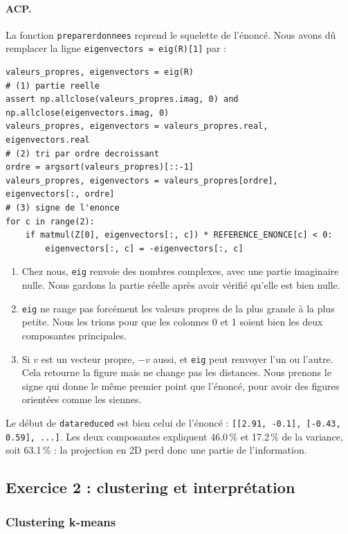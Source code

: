 \documentclass[11pt,a4paper]{article}
\renewcommand{\_}{\underscoreorig\allowbreak}
\begin{document}
\paragraph{ACP.} La fonction \texttt{preparer\_donnees} reprend le squelette de l'énoncé. Nous avons dû remplacer la ligne \texttt{eigenvectors = eig(R)[1]} par :
\begin{lstlisting}
valeurs_propres, eigenvectors = eig(R)
# (1) partie reelle
assert np.allclose(valeurs_propres.imag, 0) and np.allclose(eigenvectors.imag, 0)
valeurs_propres, eigenvectors = valeurs_propres.real, eigenvectors.real
# (2) tri par ordre decroissant
ordre = argsort(valeurs_propres)[::-1]
valeurs_propres, eigenvectors = valeurs_propres[ordre], eigenvectors[:, ordre]
# (3) signe de l'enonce
for c in range(2):
    if matmul(Z[0], eigenvectors[:, c]) * REFERENCE_ENONCE[c] < 0:
        eigenvectors[:, c] = -eigenvectors[:, c]
\end{lstlisting}
\begin{enumerate}
  \item Chez nous, \texttt{eig} renvoie des nombres complexes, avec une partie imaginaire nulle. Nous gardons la partie réelle après avoir vérifié qu'elle est bien nulle.
  \item \texttt{eig} ne range pas forcément les valeurs propres de la plus grande à la plus petite. Nous les trions pour que les colonnes 0 et 1 soient bien les deux composantes principales.
  \item Si $v$ est un vecteur propre, $-v$ aussi, et \texttt{eig} peut renvoyer l'un ou l'autre. Cela retourne la figure mais ne change pas les distances. Nous prenons le signe qui donne le même premier point que l'énoncé, pour avoir des figures orientées comme les siennes.
\end{enumerate}
Le début de \texttt{data\_reduced} est bien celui de l'énoncé : \texttt{[[2.91, -0.1], [-0.43, 0.59], ...]}. Les deux composantes expliquent 46.0\,\% et 17.2\,\% de la variance, soit 63.1\,\% : la projection en 2D perd donc une partie de l'information.

\subsection{Exercice 2 : clustering et interprétation}

\subsubsection*{Clustering k-means}
\end{document}
